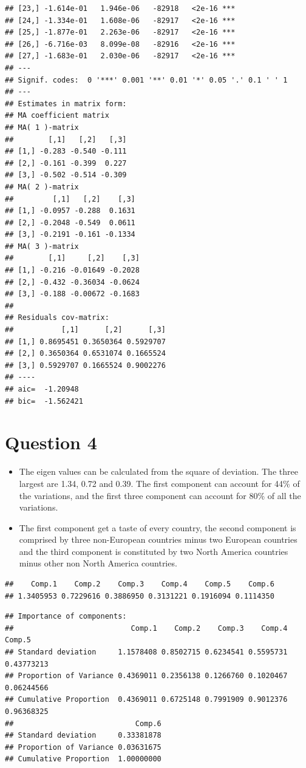 \documentclass[]{article}
\begin{document}
\begin{verbatim}
## [23,] -1.614e-01   1.946e-06   -82918   <2e-16 ***
## [24,] -1.334e-01   1.608e-06   -82917   <2e-16 ***
## [25,] -1.877e-01   2.263e-06   -82917   <2e-16 ***
## [26,] -6.716e-03   8.099e-08   -82916   <2e-16 ***
## [27,] -1.683e-01   2.030e-06   -82917   <2e-16 ***
## ---
## Signif. codes:  0 '***' 0.001 '**' 0.01 '*' 0.05 '.' 0.1 ' ' 1
## --- 
## Estimates in matrix form: 
## MA coefficient matrix 
## MA( 1 )-matrix 
##        [,1]   [,2]   [,3]
## [1,] -0.283 -0.540 -0.111
## [2,] -0.161 -0.399  0.227
## [3,] -0.502 -0.514 -0.309
## MA( 2 )-matrix 
##         [,1]   [,2]    [,3]
## [1,] -0.0957 -0.288  0.1631
## [2,] -0.2048 -0.549  0.0611
## [3,] -0.2191 -0.161 -0.1334
## MA( 3 )-matrix 
##        [,1]     [,2]    [,3]
## [1,] -0.216 -0.01649 -0.2028
## [2,] -0.432 -0.36034 -0.0624
## [3,] -0.188 -0.00672 -0.1683
##   
## Residuals cov-matrix: 
##           [,1]      [,2]      [,3]
## [1,] 0.8695451 0.3650364 0.5929707
## [2,] 0.3650364 0.6531074 0.1665524
## [3,] 0.5929707 0.1665524 0.9002276
## ---- 
## aic=  -1.20948 
## bic=  -1.562421
\end{verbatim}

\section{Question 4}\label{question-4}

\begin{itemize}
\item
  The eigen values can be calculated from the square of deviation. The
  three largest are 1.34, 0.72 and 0.39. The first component can account
  for 44\% of the variations, and the first three component can account
  for 80\% of all the variations.
\item
  The first component get a taste of every country, the second component
  is comprised by three non-European countries minus two European
  countries and the third component is constituted by two North America
  countries minus other non North America countries.
\end{itemize}

\begin{verbatim}
##    Comp.1    Comp.2    Comp.3    Comp.4    Comp.5    Comp.6 
## 1.3405953 0.7229616 0.3886950 0.3131221 0.1916094 0.1114350
\end{verbatim}

\begin{verbatim}
## Importance of components:
##                           Comp.1    Comp.2    Comp.3    Comp.4     Comp.5
## Standard deviation     1.1578408 0.8502715 0.6234541 0.5595731 0.43773213
## Proportion of Variance 0.4369011 0.2356138 0.1266760 0.1020467 0.06244566
## Cumulative Proportion  0.4369011 0.6725148 0.7991909 0.9012376 0.96368325
##                            Comp.6
## Standard deviation     0.33381878
## Proportion of Variance 0.03631675
## Cumulative Proportion  1.00000000
\end{verbatim}
\end{document}

